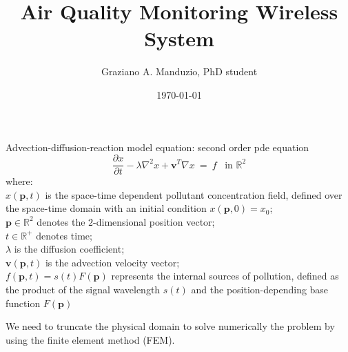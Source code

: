 \documentclass{beamer}
\title{Air Quality Monitoring Wireless System}
\author{Graziano A. Manduzio, PhD student}
\institute{University of Florence}
\date{\today}
\newcommand{\mb}{\mathbf}
\begin{document}
\begin{frame}
	\titlepage
\end{frame}
\begin{frame}
Advection-diffusion-reaction model equation: second order pde equation
\begin{equation}
		\displaystyle{\frac{\partial x}{\partial t}} - \lambda \nabla^2 x + \mb{v}^T \nabla x  ~=~ f \,\,\,\,\, \mbox{in } \mathbb{R}^2
\end{equation}
where:\\
	$x(\mb{p},t)$ is the space-time dependent pollutant concentration field, defined over the space-time domain with an initial condition $x(\mb{p},0)=x_{0}$;\\
	$\mb{p} \in \mathbb{R}^2$ denotes the $2$-dimensional position vector;\\
	$t \in \mathbb{R}^{+}$ denotes time;\\
	$\lambda$ is the diffusion coefficient;\\
	$\mb{v}(\mb{p},t)$ is the advection velocity vector;\\
	$f(\mb{p},t)=s(t)F(\mb{p})$ represents the internal sources of pollution, defined as the product of the signal wavelength $s(t)$ and the position-depending base function $F(\mb{p})$
\end{frame}
\begin{frame}
We need to truncate the physical domain to solve numerically the problem by using the finite element method (FEM).
\end{frame}
\end{document}
